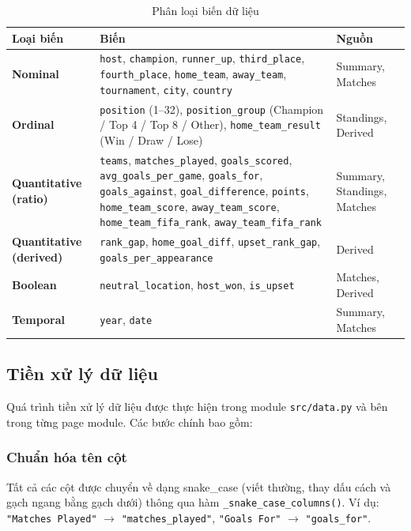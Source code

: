 \documentclass[12pt,a4paper]{article}
\begin{document}
\begin{table}[H]
\centering
\caption{Phân loại biến dữ liệu}
\label{tab:variable_classification}
\begin{tabular}{llp{7.5cm}}
\toprule
\textbf{Loại biến} & \textbf{Biến} & \textbf{Nguồn} \\
\midrule
\textbf{Nominal} & \texttt{host}, \texttt{champion}, \texttt{runner\_up}, \texttt{third\_place}, \texttt{fourth\_place}, \texttt{home\_team}, \texttt{away\_team}, \texttt{tournament}, \texttt{city}, \texttt{country} & Summary, Matches \\
\textbf{Ordinal} & \texttt{position} (1--32), \texttt{position\_group} (Champion / Top 4 / Top 8 / Other), \texttt{home\_team\_result} (Win / Draw / Lose) & Standings, Derived \\
\textbf{Quantitative (ratio)} & \texttt{teams}, \texttt{matches\_played}, \texttt{goals\_scored}, \texttt{avg\_goals\_per\_game}, \texttt{goals\_for}, \texttt{goals\_against}, \texttt{goal\_difference}, \texttt{points}, \texttt{home\_team\_score}, \texttt{away\_team\_score}, \texttt{home\_team\_fifa\_rank}, \texttt{away\_team\_fifa\_rank} & Summary, Standings, Matches \\
\textbf{Quantitative (derived)} & \texttt{rank\_gap}, \texttt{home\_goal\_diff}, \texttt{upset\_rank\_gap}, \texttt{goals\_per\_appearance} & Derived \\
\textbf{Boolean} & \texttt{neutral\_location}, \texttt{host\_won}, \texttt{is\_upset} & Matches, Derived \\
\textbf{Temporal} & \texttt{year}, \texttt{date} & Summary, Matches \\
\bottomrule
\end{tabular}
\end{table}

\subsection{Tiền xử lý dữ liệu}
Quá trình tiền xử lý dữ liệu được thực hiện trong module \texttt{src/data.py} và bên trong từng page module. Các bước chính bao gồm:

\subsubsection{Chuẩn hóa tên cột}
Tất cả các cột được chuyển về dạng snake\_case (viết thường, thay dấu cách và gạch ngang bằng gạch dưới) thông qua hàm \texttt{\_snake\_case\_columns()}. Ví dụ: \texttt{"Matches Played"} $\rightarrow$ \texttt{"matches\_played"}, \texttt{"Goals For"} $\rightarrow$ \texttt{"goals\_for"}.
\end{document}
